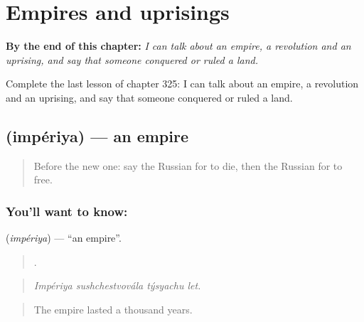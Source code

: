 
\chapter{Empires and uprisings}
\label{ch:ru-empires-and-uprisings}

\begin{chapteropening}
\textbf{By the end of this chapter:} \emph{I can talk about an empire, a revolution and an uprising, and say that someone conquered or ruled a land.}

Complete the last lesson of chapter 325: I can talk about an empire, a revolution and an uprising, and say that someone conquered or ruled a land.
\end{chapteropening}

\section[\texorpdfstring{\ru{империя} (impériya)}{империя (impériya)}]{ (impériya) — an empire}

\label{lesson:RU-C325-imperiya}



\begin{quote}
Before the new one: say the Russian for to die, then the Russian for to free.
\end{quote}

\subsection*{You'll want to know: }
\textbf{} (\emph{impériya}) — \textquotedblleft{}an empire\textquotedblright{}.

\begin{quote}
   .
\end{quote}

\begin{quote}
\emph{Impériya sushchestvovála týsyachu let.}
\end{quote}

\begin{quote}
The empire lasted a thousand years.
\end{quote}

